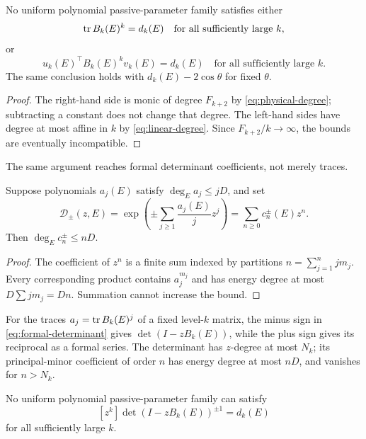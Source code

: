 \begin{corollary}
No uniform polynomial passive-parameter family satisfies either
\begin{equation}
\operatorname{tr} B_k(E)^k=d_k(E)
\quad\text{for all sufficiently large }k,
\label{eq:trace-no-go}
\end{equation}
or
\begin{equation}
u_k(E)^\top B_k(E)^kv_k(E)=d_k(E)
\quad\text{for all sufficiently large }k.
\label{eq:boundary-no-go}
\end{equation}
The same conclusion holds with \(d_k(E)-2\cos\theta\) for fixed
\(\theta\).
\end{corollary}

\begin{proof}
The right-hand side is monic of degree \(F_{k+2}\) by
\eqref{eq:physical-degree}; subtracting a constant does not change that
degree.  The left-hand sides have degree at most affine in \(k\) by
\eqref{eq:linear-degree}.  Since \(F_{k+2}/k\to\infty\), the bounds are
eventually incompatible.
\end{proof}

The same argument reaches formal determinant coefficients, not merely traces.

\begin{lemma}
Suppose polynomials \(a_j(E)\) satisfy
\(\deg_Ea_j\le jD\), and set
\begin{equation}
\mathcal D_\pm(z,E)=
\exp\left(\pm\sum_{j\ge1}\frac{a_j(E)}{j}z^j\right)
=\sum_{n\ge0}c_n^\pm(E)z^n.
\label{eq:formal-determinant}
\end{equation}
Then \(\deg_Ec_n^\pm\le nD\).
\end{lemma}

\begin{proof}
The coefficient of \(z^n\) is a finite sum indexed by partitions
\(n=\sum_{j=1}^n jm_j\).  Every corresponding product contains
\(a_j^{m_j}\) and has energy degree at most
\(D\sum jm_j=Dn\).  Summation cannot increase the bound.
\end{proof}

For the traces \(a_j=\operatorname{tr} B_k(E)^j\) of a fixed level-\(k\) matrix, the minus
sign in \eqref{eq:formal-determinant} gives
\(\det(I-zB_k(E))\), while the plus sign gives its reciprocal as a formal
series.  The determinant has \(z\)-degree at most \(N_k\); its principal-minor
coefficient of order \(n\) has energy degree at most \(nD\), and vanishes for
\(n>N_k\).

\begin{corollary}
No uniform polynomial passive-parameter family can satisfy
\[
[z^k]\det(I-zB_k(E))^{\pm1}=d_k(E)
\]
for all sufficiently large \(k\).
\end{corollary}

